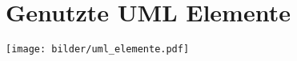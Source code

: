 \chapter{Genutzte UML Elemente}

\begin{center}
\texttt{[image: bilder/uml\_elemente.pdf]}
\end{center}

